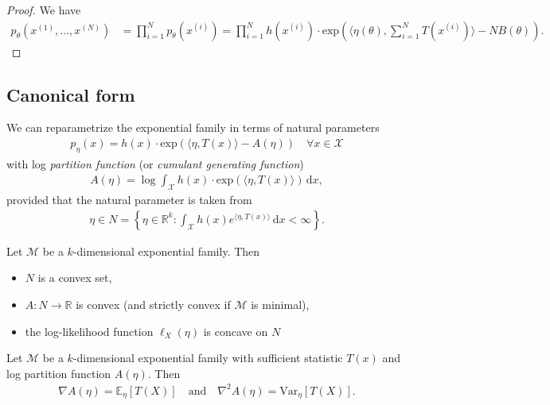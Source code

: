 \begin{proof}
  We have 
  \begin{align*}
    p_{\theta}(x^{(1)}, \dots, x^{(N)}) &= \prod^N_{i=1} p_{\theta}(x^{(i)}) = \prod^N_{i=1}h(x^{(i)}) \cdot \mathrm{exp}\left( \langle \eta(\theta), \sum^N_{i=1}T(x^{(i)}) \rangle - NB(\theta) \right).
  \end{align*}
\end{proof}

\subsection{Canonical form}

\begin{mdframed}
We can reparametrize the exponential family in terms of natural parameters 
\begin{align*}
  p_\eta(x) = h(x) \cdot \mathrm{exp}\left( \langle \eta, T(x) \rangle - A(\eta) \right) \quad \forall x \in \mathcal{X}
\end{align*}
with log \emph{partition function} (or \emph{cumulant generating function}) 
\begin{align*}
  A(\eta) = \log \int_\mathcal{X} h(x) \cdot \mathrm{exp}\left( \langle \eta, T(x) \rangle \right) \, \mathrm{d}x,
\end{align*}
provided that the natural parameter is taken from 
\begin{align*}
  \eta \in N = \left\{ \eta \in \mathbb{R}^k : \int_\mathcal{X} h(x) e^{\langle \eta, T(x) \rangle} \, \mathrm{d}x < \infty \right\}.
\end{align*}
\end{mdframed}

\begin{thm}
  Let \( \mathcal{M} \) be a \( k \)-dimensional exponential family.  Then 
  \begin{itemize}
    \item \( N \) is a convex set,
    \item \( A: N \to \mathbb R \) is convex (and strictly convex if \( \mathcal{M} \) is minimal),
    \item the log-likelihood function \( \ell_{X}(\eta) \) is concave on \( N \)
  \end{itemize}
\end{thm}

\begin{thm}
  Let \( \mathcal{M} \) be a \( k \)-dimensional exponential family with sufficient statistic \( T(x) \) and log partition function \( A(\eta) \). Then 
  \begin{align*}
    \nabla A(\eta) = \mathbb{E}_\eta[T(X)] \quad \text{and} \quad \nabla^2 A(\eta) = \mathrm{Var}_\eta[T(X)].
  \end{align*}
\end{thm}

